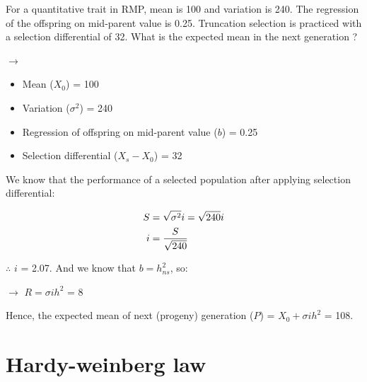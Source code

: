 \documentclass[11pt,ignorenonframetext,aspectratio=169]{beamer}
\begin{document}
\begin{frame}{}
\protect\hypertarget{section-6}{}
\footnotesize

For a quantitative trait in RMP, mean is 100 and variation is 240. The
regression of the offspring on mid-parent value is 0.25. Truncation
selection is practiced with a selection differential of 32. What is the
expected mean in the next generation ?

\(\longrightarrow\)

\begin{itemize}
\footnotesize
\item Mean ($X_0$) = 100
\item Variation ($\sigma^2$) = 240
\item Regression of offspring on mid-parent value ($b$) = 0.25
\item Selection differential ($X_s - X_0$) = 32
\end{itemize}

We know that the performance of a selected population after applying
selection differential:

\begin{align}
\small
S &= \sqrt{\sigma^2} i = \sqrt{240} i \notag \\
i &= \frac{S}{\sqrt{240}} \notag
\end{align}

\(\therefore\) \(i\) = 2.07. And we know that \(b = h^2_{ns}\), so:

\(\rightarrow\) \(R = \sigma i h^2\) = 8

Hence, the expected mean of next (progeny) generation (\(P\)) =
\(X_0 + \sigma i h^2\) = 108.
\end{frame}

\hypertarget{hardy-weinberg-law}{%
\section{Hardy-weinberg law}\label{hardy-weinberg-law}}
\end{document}

